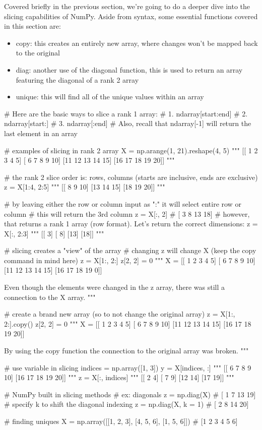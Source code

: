 Covered briefly in the previous section, we're going to do a deeper dive into the slicing capabilities of NumPy. Aside from syntax, some essential functions covered in this section are:

\begin{itemize}
	\item copy: this creates an entirely new array, where changes won't be mapped back to the original
	\item diag: another use of the diagonal function, this is used to return an array featuring the diagonal of a rank 2 array
	\item unique: this will find all of the unique values within an array
\end{itemize}

\begin{python}
	# Here are the basic ways to slice a rank 1 array:
	# 1. ndarray[start:end]
	# 2. ndarray[start:]
	# 3. ndarray[:end]
	# Also, recall that ndarray[-1] will return the last element in an array
	
	# examples of slicing in rank 2 array
	X = np.arange(1, 21).reshape(4, 5)
	"""
	[[ 1  2  3  4  5]
	[ 6  7  8  9 10]
	[11 12 13 14 15]
	[16 17 18 19 20]]
	"""
	
	# the rank 2 slice order is: rows, columns (starts are inclusive, ends are exclusive)
	z = X[1:4, 2:5]
	"""
	[[ 8  9 10]
	[13 14 15]
	[18 19 20]]
	"""
	
	# by leaving either the row or column input as ":" it will select entire row or column
	# this will return the 3rd column
	z = X[:, 2]
	# [ 3  8 13 18]
	# however, that returns a rank 1 array (row format). Let's return the correct dimensions:
	z = X[:, 2:3]
	"""
	[[ 3]
	[ 8]
	[13]
	[18]]
	"""
	
	# slicing creates a "view" of the array
	# changing z will change X (keep the copy command in mind here)
	z = X[1:, 2:]
	z[2, 2] = 0
	"""
	X =
	[[ 1  2  3  4  5]
	[ 6  7  8  9 10]
	[11 12 13 14 15]
	[16 17 18 19  0]]
	
	Even though the elements were changed in the z array, there was still a connection to the X array.
	"""
	
	# create a brand new array (so to not change the original array)
	z = X[1:, 2:].copy()
	z[2, 2] = 0
	"""
	X =
	[[ 1  2  3  4  5]
	[ 6  7  8  9 10]
	[11 12 13 14 15]
	[16 17 18 19 20]]
	
	By using the copy function the connection to the original array was broken.
	"""
	
	# use variable in slicing
	indices = np.array([1, 3])
	y = X[indices, :]
	"""
	[[ 6  7  8  9 10]
	[16 17 18 19 20]]
	"""
	z = X[:, indices]
	"""
	[[ 2  4]
	[ 7  9]
	[12 14]
	[17 19]]
	"""
	
	# NumPy built in slicing methods
	# ex: diagonals
	z = np.diag(X)
	# [ 1  7 13 19]
	# specify k to shift the diagonal indexing
	z = np.diag(X, k = 1)
	# [ 2  8 14 20]
	
	# finding uniques
	X = np.array([[1, 2, 3], [4, 5, 6], [1, 5, 6]])
	# [1 2 3 4 5 6]
\end{python}